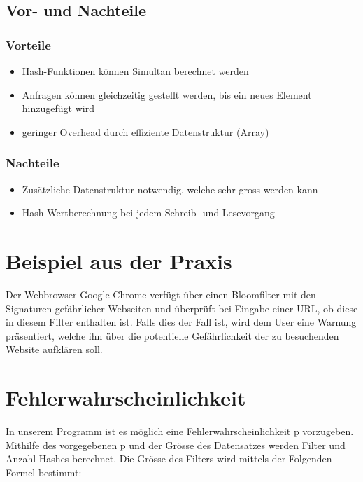\documentclass[11pt]{article}
\begin{document}
    \subsection{Vor- und Nachteile}
    \subsubsection{Vorteile}
    \begin{itemize}
        \item Hash-Funktionen k{\"o}nnen Simultan berechnet werden
        \item Anfragen k{\"o}nnen gleichzeitig gestellt werden, bis ein neues Element hinzugef{\"u}gt wird
        \item geringer Overhead durch effiziente Datenstruktur (Array)
    \end{itemize}

    \subsubsection{Nachteile}
    \begin{itemize}
        \item Zus{\"a}tzliche Datenstruktur notwendig, welche sehr gross werden kann
        \item Hash-Wertberechnung bei jedem Schreib- und Lesevorgang
    \end{itemize}

    \section{Beispiel aus der Praxis}
    Der Webbrowser Google Chrome verf{\"u}gt {\"u}ber einen Bloomfilter mit den Signaturen gef{\"a}hrlicher Webseiten und {\"u}berpr{\"u}ft bei Eingabe einer URL, ob diese in diesem Filter enthalten ist.
    Falls dies der Fall ist, wird dem User eine Warnung pr{\"a}sentiert, welche ihn {\"u}ber die potentielle Gef{\"a}hrlichkeit der zu besuchenden Website aufkl{\"a}ren soll.

    \section{Fehlerwahrscheinlichkeit}
    In unserem Programm ist es m{\"o}glich eine Fehlerwahrscheinlichkeit p vorzugeben.
    Mithilfe des vorgegebenen p und der Gr{\"o}sse des Datensatzes werden Filter und Anzahl Hashes berechnet.
    Die Gr{\"o}sse des Filters wird mittels der Folgenden Formel bestimmt:
\end{document}
